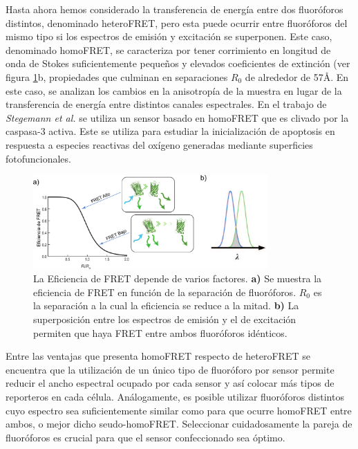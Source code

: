 Hasta ahora hemos considerado la transferencia de energía entre dos fluoróforos distintos, denominado heteroFRET, pero esta puede ocurrir entre fluoróforos del mismo tipo si los espectros de emisión y excitación se superponen. Este caso, denominado homoFRET, se caracteriza por tener corrimiento en longitud de onda de Stokes suficientemente pequeños y elevados coeficientes de extinción (ver figura \ref{fig:EspectroFRET}b, propiedades que culminan en separaciones $R_0$ de alrededor de 57\AA\cite{Lakowicz2006}. En este caso, se analizan los cambios en la anisotropía de la muestra en lugar de la transferencia de energía entre distintos canales espectrales. En el trabajo de \textit{Stegemann et al.} se utiliza un sensor basado en homoFRET que es clivado por la caspasa-3 activa. Este se utiliza para estudiar la inicialización de apoptosis en respuesta a especies reactivas del oxígeno generadas mediante superficies fotofuncionales\cite{Grecco2015}.

\begin{figure}
\centering
    \includegraphics[width=0.8\textwidth]{./img/FRETAnisotropia.png}
    \caption{La Eficiencia de FRET depende de varios factores. \textbf{a)} Se muestra la eficiencia de FRET en función de la separación de fluoróforos. $R_0$ es la separación a la cual la eficiencia se reduce a la mitad. \textbf{b)} La superposición entre los espectros de emisión y el de excitación permiten que haya FRET entre ambos fluoróforos idénticos.}
    \label{fig:EspectroFRET}
\end{figure}

Entre las ventajas que presenta homoFRET respecto de heteroFRET se encuentra que la utilización de un único tipo de fluoróforo por sensor permite reducir el ancho espectral ocupado por cada sensor y así colocar más tipos de reporteros en cada célula. Análogamente, es posible utilizar fluoróforos distintos cuyo espectro sea suficientemente similar como para que ocurre homoFRET entre ambos, o mejor dicho seudo-homoFRET. Seleccionar cuidadosamente la pareja de fluoróforos es crucial para que el sensor confeccionado sea óptimo.

